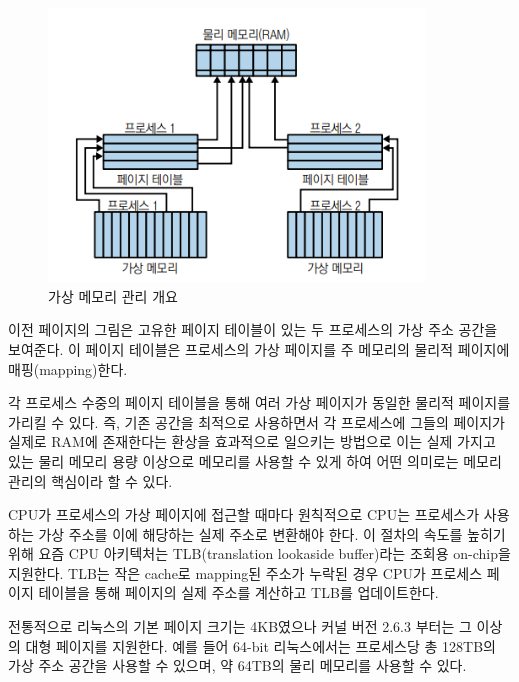 \begin{figure}[h]
    \centering
    \includegraphics[width=10cm]{resource/2-3.png}
    \caption{가상 메모리 관리 개요}
\end{figure}
\newpage

\begin{flushleft}
    이전 페이지의 그림은 고유한 페이지 테이블이 있는 두 프로세스의 가상 주소 공간을 보여준다.
    이 페이지 테이블은 프로세스의 가상 페이지를 주 메모리의 물리적 페이지에 매핑(mapping)한다.
\end{flushleft}

\begin{flushleft}
    각 프로세스 수중의 페이지 테이블을 통해 여러 가상 페이지가 동일한 물리적 페이지를 가리킬 수 있다.
    즉, 기존 공간을 최적으로 사용하면서 
    각 프로세스에 그들의 페이지가 실제로 RAM에 존재한다는 환상을 효과적으로 일으키는 방법으로
    이는 실제 가지고 있는 물리 메모리 용량 이상으로 메모리를 사용할 수 있게 하여 
    어떤 의미로는 메모리 관리의 핵심이라 할 수 있다.
\end{flushleft}

\begin{flushleft}
    CPU가 프로세스의 가상 페이지에 접근할 때마다
    원칙적으로 CPU는 프로세스가 사용하는 가상 주소를 이에 해당하는 실제 주소로 변환해야 한다.
    이 절차의 속도를 높히기 위해 요즘 CPU 아키텍처는 TLB(translation lookaside buffer)라는
    조회용 on-chip을 지원한다.
    TLB는 작은 cache로 mapping된 주소가 누락된 경우 CPU가 프로세스 페이지 테이블을 통해
    페이지의 실제 주소를 계산하고 TLB를 업데이트한다.
\end{flushleft}

\begin{flushleft}
    전통적으로 리눅스의 기본 페이지 크기는 4KB였으나 커널 버전 2.6.3 부터는 그 이상의 대형 페이지를 지원한다.
    예를 들어 64-bit 리눅스에서는 프로세스당 총 128TB의 가상 주소 공간을 사용할 수 있으며,
    약 64TB의 물리 메모리를 사용할 수 있다.
\end{flushleft}

